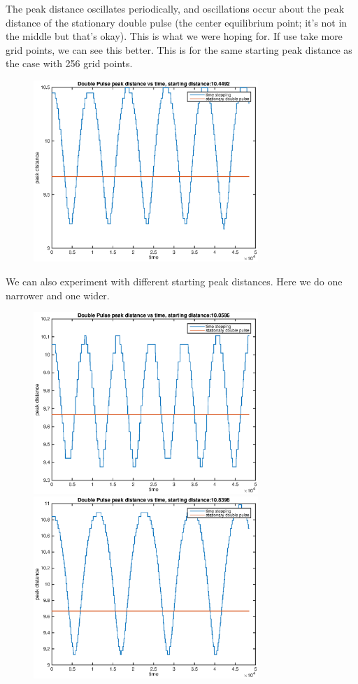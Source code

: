 \documentclass[12pt]{article}
\begin{document}
The peak distance oscillates periodically, and oscillations occur about the peak distance of the stationary double pulse (the center equilibrium point; it's not in the middle but that's okay). This is what we were hoping for. If use take more grid points, we can see this better. This is for the same starting peak distance as the case with 256 grid points.

\begin{figure}[H]
	\includegraphics[width=8.5cm]{2double1a_osc1_1024.eps}
\end{figure}

We can also experiment with different starting peak distances. Here we do one narrower and one wider.

\begin{figure}[H]
	\includegraphics[width=8.5cm]{2double1a_osc2_1024.eps}
	\includegraphics[width=8.5cm]{2double1a_osc3_1024.eps}
\end{figure}
\end{document}

